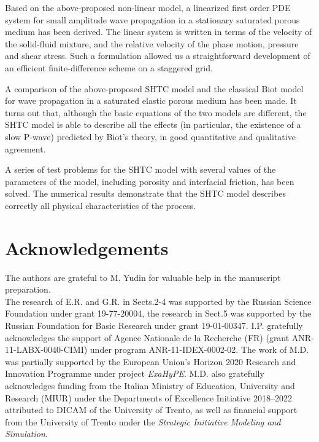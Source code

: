 \documentclass[3p,times,table]{article}
\begin{document}
Based on the above-proposed non-linear model, a linearized first order PDE system 
for small amplitude wave propagation in a stationary saturated porous medium 
has been derived. The linear system is written in terms of the velocity of the 
solid-fluid mixture, and the relative velocity of the phase motion, pressure and shear 
stress. Such a formulation allowed us a straightforward development of an 
efficient finite-difference scheme on a staggered grid.  

A comparison of the above-proposed SHTC model and the classical Biot model for wave 
propagation in a saturated elastic porous  medium has been made.
It turns out that, although the basic equations of the two models are different, 
the SHTC model is able to describe all the effects (in particular, the 
existence of a slow P-wave) predicted by Biot's theory, in good quantitative 
and qualitative agreement.

A series of test problems for the SHTC model with several values of 
the parameters of the model, including porosity and interfacial friction, has been 
solved. The numerical results demonstrate that the SHTC model describes 
correctly all physical characteristics of the process.   

\section*{Acknowledgements}
% 
The authors are grateful to M. Yudin for valuable help in the manuscript 
preparation.
\\
The research of E.R. and G.R. in Sects.2-4 was supported by the Russian Science Foundation  under grant 19-77-20004, the research in Sect.5 was supported by the Russian Foundation for Basic Research under grant 19-01-00347.
I.P. gratefully acknowledges the support of Agence Nationale de la Recherche (FR) 
(grant ANR-11-LABX-0040-CIMI) under program ANR-11-IDEX-0002-02.
The work of M.D. was partially supported by the European Union's Horizon 2020 Research and Innovation  Programme under project \textit{ExaHyPE}. 
M.D. also gratefully acknowledges funding from the Italian Ministry of Education, University and Research (MIUR) under the Departments of Excellence Initiative 2018--2022 attributed to DICAM of the University of Trento, as well as financial support from the University of Trento under the  \textit{Strategic Initiative Modeling and Simulation}.



\printbibliography
\end{document}
